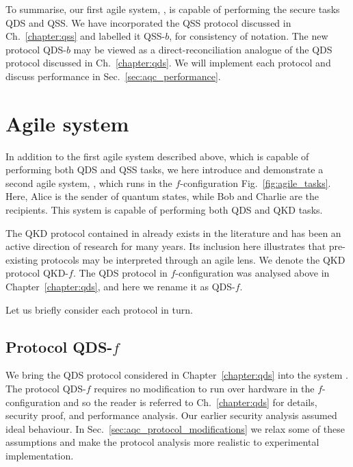 To summarise, our first agile system, \systemB, is capable of performing the secure tasks QDS and QSS. We have incorporated the QSS protocol discussed in Ch.~\ref{chapter:qss} and labelled it QSS-$b$, for consistency of notation. The new protocol QDS-$b$ may be viewed as a direct-reconciliation analogue of the QDS protocol discussed in Ch.~\ref{chapter:qds}. We will implement each protocol and discuss performance in Sec.~\ref{sec:aqc_performance}.

\section{Agile system \systemF}\label{sec:aqc_systemf}

In addition to the first agile system described above, which is capable of performing both QDS and QSS tasks, we here introduce and demonstrate a second agile system, \systemF, which runs in the $f$-configuration Fig.~\ref{fig:agile_tasks}. Here, Alice is the sender of quantum states, while Bob and Charlie are the recipients. This system is capable of performing both QDS and QKD tasks.

The QKD protocol contained in \systemF \; already exists in the literature \cite{Leverrier2011a, Papanastasiou2018} and has been an active direction of research for many years. Its inclusion here illustrates that pre-existing protocols may be interpreted through an agile lens. We denote the QKD protocol QKD-$f$. The QDS protocol in $f$-configuration was analysed above in Chapter~\ref{chapter:qds}, and here we rename it as QDS-$f$.

Let us briefly consider each protocol in turn.

\subsection{Protocol QDS-$f$}
We bring the QDS protocol considered in Chapter~\ref{chapter:qds} into the system \systemF. The protocol QDS-$f$ requires no modification to run over hardware in the $f$-configuration and so the reader is referred to Ch.~\ref{chapter:qds} for details, security proof, and performance analysis. Our earlier security analysis assumed ideal behaviour. In Sec.~\ref{sec:aqc_protocol_modifications} we relax some of these assumptions and make the protocol analysis more realistic to experimental implementation.


